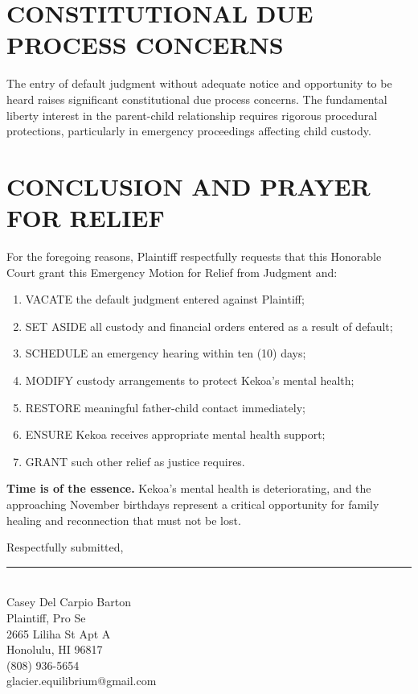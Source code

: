 \documentclass[12pt,letterpaper]{article}
\begin{document}
\section{CONSTITUTIONAL DUE PROCESS CONCERNS}

The entry of default judgment without adequate notice and opportunity to be heard raises significant constitutional due process concerns. The fundamental liberty interest in the parent-child relationship requires rigorous procedural protections, particularly in emergency proceedings affecting child custody.

\section{CONCLUSION AND PRAYER FOR RELIEF}

For the foregoing reasons, Plaintiff respectfully requests that this Honorable Court grant this Emergency Motion for Relief from Judgment and:

\begin{enumerate}
\item VACATE the default judgment entered against Plaintiff;
\item SET ASIDE all custody and financial orders entered as a result of default;
\item SCHEDULE an emergency hearing within ten (10) days;
\item MODIFY custody arrangements to protect Kekoa's mental health;
\item RESTORE meaningful father-child contact immediately;
\item ENSURE Kekoa receives appropriate mental health support;
\item GRANT such other relief as justice requires.
\end{enumerate}

\vspace{0.3in}

\textbf{Time is of the essence.} Kekoa's mental health is deteriorating, and the approaching November birthdays represent a critical opportunity for family healing and reconnection that must not be lost.

\vspace{0.5in}

Respectfully submitted,

\vspace{1in}

\rule{3in}{0.4pt}\\
Casey Del Carpio Barton\\
Plaintiff, Pro Se\\
2665 Liliha St Apt A\\
Honolulu, HI 96817\\
(808) 936-5654\\
glacier.equilibrium@gmail.com
\end{document}
